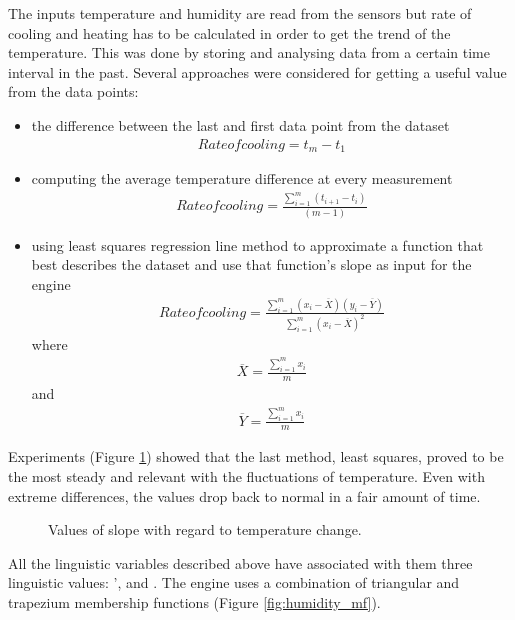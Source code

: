 \documentclass[conference]{IEEEtran}
\begin{document}
The inputs temperature and humidity are read from the sensors but rate of cooling and heating has to be
calculated in order to get the trend of the temperature. This was done by storing and analysing data from
a certain time interval in the past. Several approaches were considered for getting a useful value from the
data points:
\begin{itemize}

\item the difference between the last and first data point from the dataset
\begin{align}
Rate of cooling = t_{m} - t_{1}
\end{align}

\item computing the average temperature difference at every measurement
\begin{align}
Rate of cooling = \frac{\sum_{i=1}^{m}(t_{i + 1} - t_{i})}{(m - 1)}
\end{align}

\item using least squares regression line method to approximate a function that best describes the dataset
and use that function's slope as input for the engine
\begin{align}
Rate of cooling = \frac{\sum_{i=1}^{m}(x_{i} - \overline{X})(y_{i} - \overline{Y})}{\sum_{i=1}^{m}(x_{i} - \overline{X})^2}
\end{align}
where
\begin{align}
\overline{X} = \frac{\sum_{i=1}^{m} x_{i}}{m}
\end{align}
and
\begin{align}
\overline{Y} = \frac{\sum_{i=1}^{m} x_{i}}{m}
\end{align}

\end{itemize}

Experiments (Figure \ref{fig:experiments}) showed that the last method, least squares, proved to be the most steady and relevant with the
fluctuations of temperature.
Even with extreme differences, the values drop back to normal in a fair amount of time.

\begin{figure}[h!]
\label{fig:nn}
\centerline{}
      \caption[MainModule]{Values of slope with regard to temperature change.}
\label{fig:experiments}
\end{figure}

All the linguistic variables described above have associated with them three linguistic values: ',
 and . The engine uses a combination of triangular and trapezium membership functions
(Figure \ref{fig:humidity_mf}).
\end{document}

